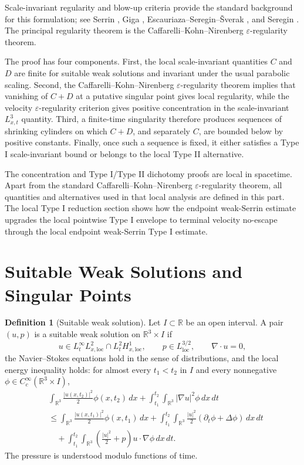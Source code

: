 \documentclass[11pt]{amsart}
\theoremstyle{plain}
\theoremstyle{definition}
\newtheorem{definition}[definition]{Definition}
\theoremstyle{remark}
\numberwithin{equation}{section}
\begin{document}
Scale-invariant regularity and blow-up criteria provide the standard background
for this formulation; see Serrin \cite{Serrin1962}, Giga \cite{Giga1986},
Escauriaza--Seregin--{\v S}verak \cite{ESS2003}, and Seregin
\cite{Seregin2012}.  The principal regularity theorem is the
Caffarelli--Kohn--Nirenberg \(\varepsilon\)-regularity theorem.

The proof has four components.  First, the local scale-invariant
quantities \(C\) and \(D\) are finite for suitable weak solutions and invariant
under the usual parabolic scaling.  Second, the Caffarelli--Kohn--Nirenberg
\(\varepsilon\)-regularity theorem implies that vanishing of \(C+D\) at a
putative singular point gives local regularity, while the velocity
\(\varepsilon\)-regularity criterion gives positive concentration in the
scale-invariant \(L^3_{x,t}\) quantity.  Third, a finite-time singularity
therefore produces sequences of shrinking cylinders on which \(C+D\), and
separately \(C\), are bounded below by positive constants.  Finally, once such
a sequence is fixed, it either satisfies a Type I scale-invariant bound or
belongs to the local Type II alternative.

The concentration and Type I/Type II dichotomy proofs are local in
spacetime.  Apart from the standard Caffarelli--Kohn--Nirenberg
\(\varepsilon\)-regularity theorem, all quantities and alternatives used in
that local analysis are defined in this part.  The local Type I reduction section
shows how the endpoint weak-Serrin estimate upgrades the local pointwise Type I
envelope to terminal velocity no-escape through the local endpoint weak-Serrin
Type I estimate.

\section{Suitable Weak Solutions and Singular Points}

\begin{definition}[Suitable weak solution]
Let \(I\subset\mathbb R\) be an open interval.  A pair \((u,p)\) is a suitable
weak solution on \(\mathbb R^3\times I\) if
\[
  u\in L^\infty_tL^2_{x,\mathrm{loc}}
  \cap L^2_tH^1_{x,\mathrm{loc}},
  \qquad
  p\in L^{3/2}_{\mathrm{loc}},
  \qquad
  \nabla\cdot u=0,
\]
the Navier--Stokes equations hold in the sense of distributions, and the local
energy inequality holds: for almost every \(t_1<t_2\) in \(I\) and every
nonnegative \(\phi\in C_c^\infty(\mathbb R^3\times I)\),
\[
\begin{aligned}
&\int_{\mathbb R^3}\frac{|u(x,t_2)|^2}{2}\phi(x,t_2)\,dx
 +\int_{t_1}^{t_2}\int_{\mathbb R^3}|\nabla u|^2\phi\,dx\,dt \\
&\le
 \int_{\mathbb R^3}\frac{|u(x,t_1)|^2}{2}\phi(x,t_1)\,dx
 +\int_{t_1}^{t_2}\int_{\mathbb R^3}
   \frac{|u|^2}{2}(\partial_t\phi+\Delta\phi)\,dx\,dt \\
&\quad
 +\int_{t_1}^{t_2}\int_{\mathbb R^3}
   \left(\frac{|u|^2}{2}+p\right)u\cdot\nabla\phi\,dx\,dt .
\end{aligned}
\]
The pressure is understood modulo functions of time.
\end{definition}
\end{document}

